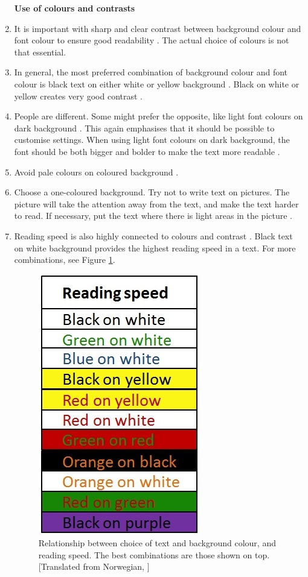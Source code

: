 \begin{enumerate}[{g}.1]
\textbf{Use of colours and contrasts}
\item It is important with sharp and clear contrast between background colour and font colour to ensure good readability \cite{blindeforbundetTekst} \cite{actionforblindpeopleTekst}. The actual choice of colours is not that essential.   
\item In general, the most preferred combination of background colour and font colour is black text on either white or yellow background \cite{actionforblindpeopleTekst}. Black on white or yellow creates very good contrast \cite{blindeforbundetTekst}. 
\item People are different. Some might prefer the opposite, like light font colours on dark background \cite{blindeforbundetTekst}. This again emphasises that it should be possible to customise settings. When using light font colours on dark background, the font should be both bigger and bolder to make the text more readable \cite{actionforblindpeopleTekst}.
\item Avoid pale colours on coloured background \cite{blindeforbundetTekst}.  
\item Choose a one-coloured background. Try not to write text on pictures. The picture will take the attention away from the text, and make the text harder to read. If necessary, put the text where there is light areas in the picture  \cite{blindeforbundetTekst}.  
\item Reading speed is also highly connected to colours and contrast  \cite{blindeforbundetTekst}. Black text on white background provides the highest reading speed in a text. For more combinations, see Figure \ref{fig:contrastreadingspeed}.

\begin{figure} [ht!]
\centering
\includegraphics[scale=0.5]{readingcolors.jpg}
\caption[Colours and contrasts - reading speed]{Relationship between choice of text and background colour, and reading speed. The best combinations are those shown on top. [Translated from Norwegian, \cite{blindeforbundetTekst}]}
\label{fig:contrastreadingspeed}
\end{figure}


\end{enumerate}
